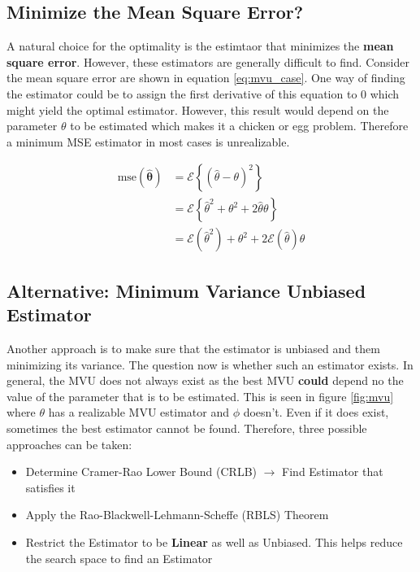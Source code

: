 \subsection{Minimize the Mean Square Error?}

A natural choice for the optimality is the estimtaor that minimizes the \textbf{mean square error}. However, these estimators are generally difficult to find. Consider the mean square error are shown in equation \ref{eq:mvu_case}. One way of finding the estimator could be to assign the first derivative of this equation to $0$ which might yield the optimal estimator. However, this result would depend on the parameter $\theta$ to be estimated which makes it a chicken or egg problem. Therefore a minimum MSE estimator in most cases is unrealizable.

\begin{equation}
    \begin{split}
        \text{mse}(\hat{\mathbf{\theta}}) &= \mathcal{E}\left\{(\hat{\theta} - \theta)^2\right\} \\
        &= \mathcal{E} \left\{\hat{\theta}^2 + \theta^2 + 2\hat{\theta}\theta\right\} \\
        &= \mathcal{E}(\hat{\theta}^2) + \theta^2 + 2\mathcal{E}(\hat{\theta})\theta
    \end{split}
    \label{eq:mvu_case}
\end{equation}

\subsection{Alternative: Minimum Variance Unbiased Estimator}

Another approach is to make sure that the estimator is unbiased and them minimizing its variance. The question now is whether such an estimator exists. In general, the MVU does not always exist as the best MVU \textbf{could} depend no the value of the parameter that is to be estimated. This is seen in figure \ref{fig:mvu} where $\theta$ has a realizable MVU estimator and $\phi$ doesn't. Even if it does exist, sometimes the best estimator cannot be found. Therefore, three possible approaches can be taken:

\begin{itemize}
    \item Determine Cramer-Rao Lower Bound (CRLB) $\longrightarrow$ Find Estimator that satisfies it
    \item Apply the Rao-Blackwell-Lehmann-Scheffe (RBLS) Theorem
    \item Restrict the Estimator to be \textbf{Linear} as well as Unbiased. This helps reduce the search space to find an Estimator
\end{itemize}